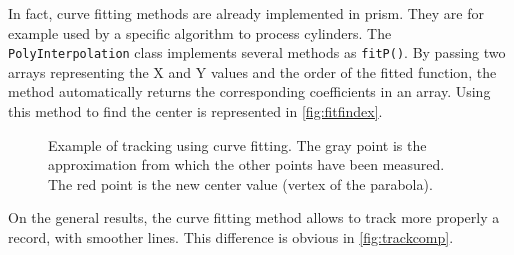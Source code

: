In fact, curve fitting methods are already implemented in \gls{prism}. They are for example used by a specific algorithm to process cylinders. The \texttt{PolyInterpolation} class implements several methods as \texttt{fitP()}. By passing two arrays representing the X and Y values and the order of the fitted function, the method automatically returns the corresponding coefficients in an array. Using this method to find the center is represented in \autoref{fig:fitfindex}.

\begin{figure}[!ht]
\centering
{}
\caption[Example of tracking using curve fitting.]
{Example of tracking using curve fitting. The gray point is the approximation from which the other points have been measured. The red point is the new center value (vertex of the parabola).}
\label{fig:fitfindex}
\end{figure}

On the general results, the curve fitting method allows to track more properly a record, with smoother lines. This difference is obvious in \autoref{fig:trackcomp}.

